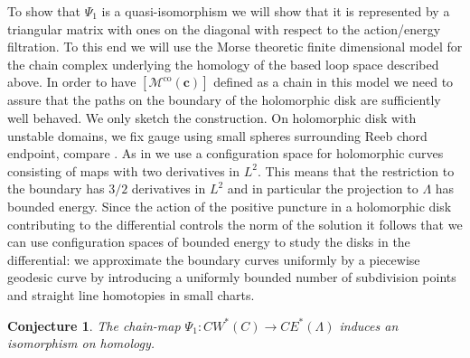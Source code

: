 \documentclass{gtpart}
\newtheorem{conj}[thm]{Conjecture}
\renewcommand{\co}{\mathrm{co}}
\begin{document}
To show that $\Psi_{1}$ is a quasi-isomorphism we will show that it is represented by a triangular
matrix with ones on the diagonal with respect to the action/energy filtration. To this end we will
use the Morse theoretic finite dimensional model for the chain complex underlying the homology of the based loop space described above. In order to have $[\mathcal{M}^{\co}(\mathbf{c})]$ defined as a chain in this model we need to assure that the paths on the boundary of the holomorphic disk are sufficiently well behaved. We only sketch the construction. On holomorphic disk with unstable domains, we fix gauge using small spheres surrounding Reeb chord endpoint, compare \cite[Section A.2]{ES}. As in \cite[Section A.1]{ES} we use a configuration space for holomorphic curves consisting of maps with two derivatives in $L^{2}$. This means that the restriction to the boundary has $3/2$ derivatives in $L^{2}$ and in particular the projection to $\Lambda$ has bounded energy. Since the action of the positive puncture in a holomorphic disk contributing to the differential controls the norm of the solution it follows that we can use configuration spaces of bounded energy to study the disks in the differential: we approximate the boundary curves uniformly by a piecewise geodesic curve by introducing a uniformly bounded number of subdivision points and straight line homotopies in small charts. 

\begin{conj}\label{appconj}
The chain-map $\Psi_{1}\colon CW^{\ast}(C)\to CE^{\ast}(\Lambda)$ induces an isomorphism on homology. 
\end{conj}
\end{document}
